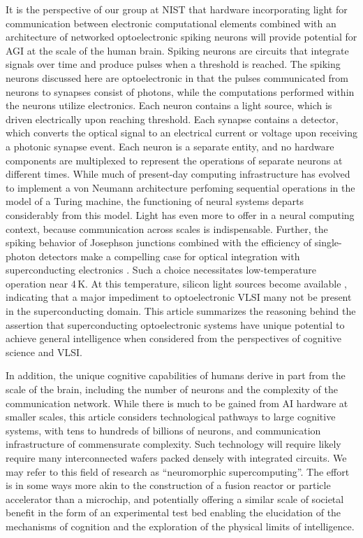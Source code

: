 \documentclass[twocolumn]{article}
\begin{document}
It is the perspective of our group at NIST that hardware incorporating light for communication between electronic computational elements combined with an architecture of networked optoelectronic spiking neurons will provide potential for AGI at the scale of the human brain. Spiking neurons are circuits that integrate signals over time and produce pulses when a threshold is reached. The spiking neurons discussed here are optoelectronic in that the pulses communicated from neurons to synapses consist of photons, while the computations performed within the neurons utilize electronics. Each neuron contains a light source, which is driven electrically upon reaching threshold. Each synapse contains a detector, which converts the optical signal to an electrical current or voltage upon receiving a photonic synapse event. Each neuron is a separate entity, and no hardware components are multiplexed to represent the operations of separate neurons at different times. While much of present-day computing infrastructure has evolved to implement a von Neumann architecture perfoming sequential operations in the model of a Turing machine, the functioning of neural systems departs considerably from this model. Light has even more to offer in a neural computing context, because communication across scales is indispensable. Further, the spiking behavior of Josephson junctions combined with the efficiency of single-photon detectors make a compelling case for optical integration with superconducting electronics \cite{shbu2017,sh2018}. Such a choice necessitates low-temperature operation near 4\,K. At this temperature, silicon light sources become available \cite{buch2017}, indicating that a major impediment to optoelectronic VLSI many not be present in the superconducting domain. This article summarizes the reasoning behind the assertion that superconducting optoelectronic systems have unique potential to achieve general intelligence when considered from the perspectives of cognitive science and VLSI.

In addition, the unique cognitive capabilities of humans derive in part from the scale of the brain, including the number of neurons and the complexity of the communication network. While there is much to be gained from AI hardware at smaller scales, this article considers technological pathways to large cognitive systems, with tens to hundreds of billions of neurons, and communication infrastructure of commensurate complexity. Such technology will require likely require many interconnected wafers packed densely with integrated circuits. We may refer to this field of research as ``neuromorphic supercomputing''. The effort is in some ways more akin to the construction of a fusion reactor or particle accelerator than a microchip, and potentially offering a similar scale of societal benefit in the form of an experimental test bed enabling the elucidation of the mechanisms of cognition and the exploration of the physical limits of intelligence.
\end{document}
